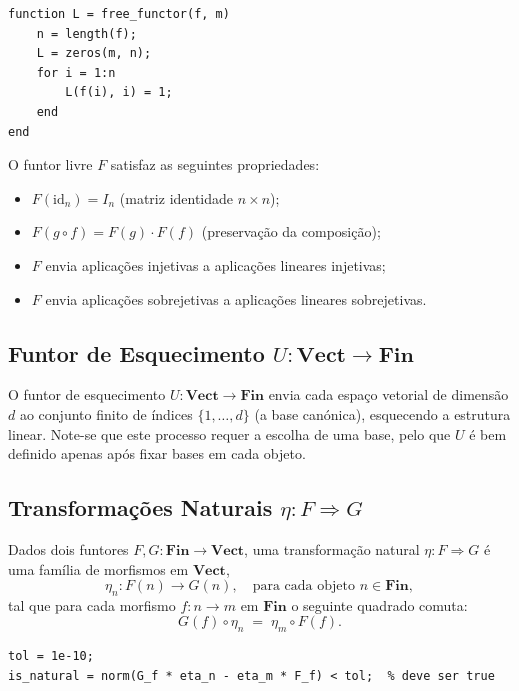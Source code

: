 \begin{lstlisting}[style=matlab, caption={Funtor livre $F$ aplicado a um morfismo}]
function L = free_functor(f, m)
    n = length(f);
    L = zeros(m, n);
    for i = 1:n
        L(f(i), i) = 1;
    end
end
\end{lstlisting}

\begin{proposition}
O funtor livre $F$ satisfaz as seguintes propriedades:
\begin{itemize}
    \item $F(\mathrm{id}_n) = I_n$ (matriz identidade $n \times n$);
    \item $F(g \circ f) = F(g) \cdot F(f)$ (preservação da composição);
    \item $F$ envia aplicações injetivas a aplicações lineares injetivas;
    \item $F$ envia aplicações sobrejetivas a aplicações lineares sobrejetivas.
\end{itemize}
\end{proposition}

\subsection{Funtor de Esquecimento $U: \mathbf{Vect} \to \mathbf{Fin}$}

O funtor de esquecimento $U: \mathbf{Vect} \to \mathbf{Fin}$ envia cada espaço vetorial de dimensão $d$ ao conjunto finito de índices $\{1,\ldots,d\}$ (a base canónica), esquecendo a estrutura linear. Note-se que este processo requer a escolha de uma base, pelo que $U$ é bem definido apenas após fixar bases em cada objeto.

\subsection{Transformações Naturais $\eta: F \Rightarrow G$}

Dados dois funtores $F, G: \mathbf{Fin} \to \mathbf{Vect}$, uma transformação natural $\eta: F \Rightarrow G$ é uma família de morfismos em $\mathbf{Vect}$,
\[
    \eta_n: F(n) \to G(n), \quad \text{para cada objeto } n \in \mathbf{Fin},
\]
tal que para cada morfismo $f: n \to m$ em $\mathbf{Fin}$ o seguinte quadrado comuta:
\[
    G(f) \circ \eta_n \;=\; \eta_m \circ F(f).
\]

\begin{lstlisting}[style=matlab, caption={Verificação da condição de naturalidade em $\mathbf{Vect}$}]
% G_f, F_f: matrizes de F(f) e G(f); eta_n, eta_m: componentes de eta
tol = 1e-10;
is_natural = norm(G_f * eta_n - eta_m * F_f) < tol;  % deve ser true
\end{lstlisting}

